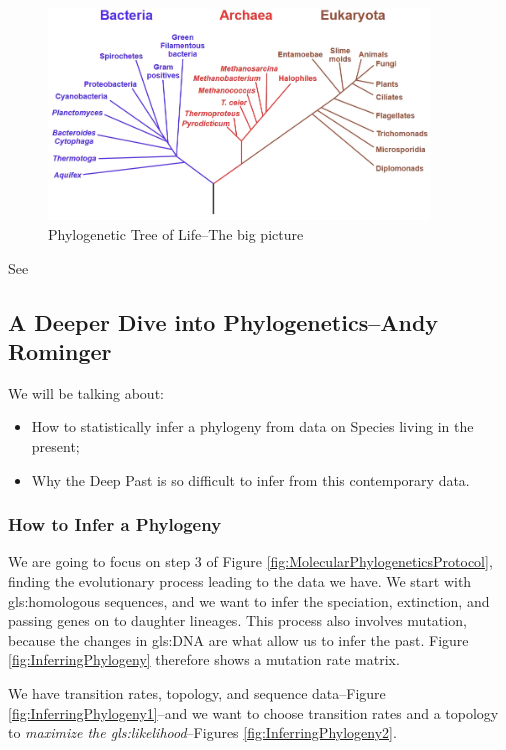\documentclass[]{article}
\begin{document}
\begin{figure}[H]
	\caption[Phylogenetic Tree of Life--The big picture]{Phylogenetic Tree of Life--The big picture\cite{wiki:tol:biology}}
	\label{flg:the:big:picture}
	\includegraphics[width=0.9\textwidth]{TOL5}
\end{figure}

See \cite{hillis1996molecular,zuckerkandl1965molecules,williams2006assessing,woese2002evolution}

\subsection[A Deeper Dive into Phylogenetics]{A Deeper Dive into Phylogenetics--Andy Rominger}

We will be talking about:
\begin{itemize}
	\item How to statistically infer a phylogeny from data on Species living in the present;
	\item Why the Deep Past is so difficult to infer from this contemporary data.
\end{itemize}

\subsubsection{How to Infer a Phylogeny}
We are going to focus on step 3 of Figure \ref{fig:MolecularPhylogeneticsProtocol}, finding the evolutionary process leading to the data we have. We start with \gls{gls:homologous} sequences, and we want to infer the speciation, extinction, and passing genes on to daughter lineages. This process also involves mutation, because the changes in \gls{gls:DNA} are what allow us to infer the past. Figure  \ref{fig:InferringPhylogeny} therefore shows a mutation rate matrix. 

We have transition rates, topology, and sequence data--Figure \ref{fig:InferringPhylogeny1}--and we want to choose transition rates and a topology to \textit{maximize the \gls{gls:likelihood}}--Figures \ref{fig:InferringPhylogeny2}. 
\end{document}
